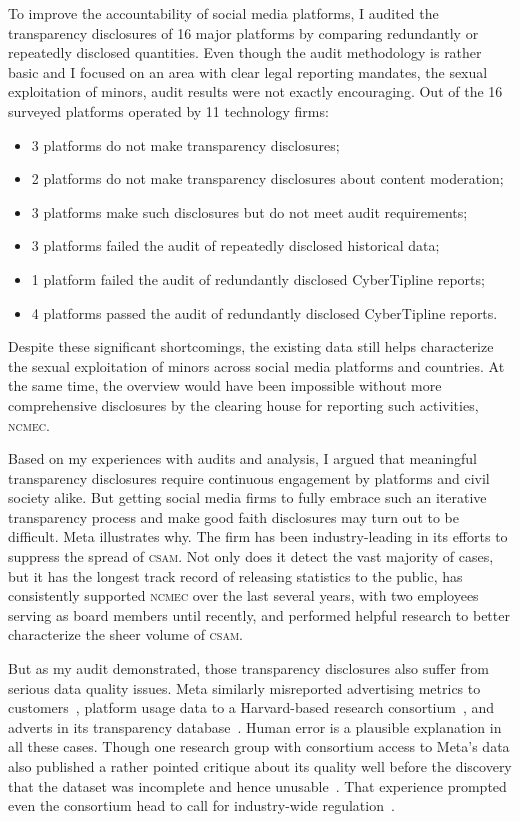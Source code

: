 \documentclass[nonacm,screen]{acmart}
\newcommand\V[1]{\textsc{\MakeLowercase{#1}}}
\begin{document}
To improve the accountability of social media platforms, I audited the
transparency disclosures of 16 major platforms by comparing redundantly or
repeatedly disclosed quantities. Even though the audit methodology is rather
basic and I focused on an area with clear legal reporting mandates, the sexual
exploitation of minors, audit results were not exactly encouraging. Out of the
16 surveyed platforms operated by 11 technology firms:
\begin{itemize}
\item[\ding{56}] 3 platforms do not make transparency disclosures;
\item[\ding{56}] 2 platforms do not make transparency disclosures about content moderation;
\item[\ding{56}] 3 platforms make such disclosures but do not meet audit requirements;
\item[\ding{56}] 3 platforms failed the audit of repeatedly disclosed historical data;
\item[\ding{56}] 1 platform failed the audit of redundantly disclosed CyberTipline reports;
\item[\ding{52}] 4 platforms passed the audit of redundantly disclosed CyberTipline reports.
\end{itemize}
Despite these significant shortcomings, the existing data still helps
characterize the sexual exploitation of minors across social media platforms and
countries. At the same time, the overview would have been impossible without
more comprehensive disclosures by the clearing house for reporting such
activities, \V{NCMEC}.

Based on my experiences with audits and analysis, I argued that meaningful
transparency disclosures require continuous engagement by platforms and civil
society alike. But getting social media firms to fully embrace such an iterative
transparency process and make good faith disclosures may turn out to be
difficult. Meta illustrates why. The firm has been industry-leading in its
efforts to suppress the spread of \V{CSAM}. Not only does it detect the vast
majority of cases, but it has the longest track record of releasing statistics
to the public, has consistently supported \V{NCMEC} over the last several years,
with two employees serving as board members until recently, and performed
helpful research to better characterize the sheer volume of \V{CSAM}.

But as my audit demonstrated, those transparency disclosures also suffer from
serious data quality issues. Meta similarly misreported advertising metrics to
customers~\cite{BruellPatel2020,Hutchinson2016,Hutchinson2016b,Hutchinson2017,
VranicaMarshall2016}, platform usage data to a Harvard-based research
consortium~\cite{Timberg2021}, and adverts in its transparency
database~\cite{Rosenberg2019,ScottMontellaro2021,SilvermanMac2020a}. Human error
is a plausible explanation in all these cases. Though one research group with
consortium access to Meta's data also published a rather pointed critique about
its quality well before the discovery that the dataset was incomplete and hence
unusable~\cite{Hegelich2020,HegelichMarcoea2020}. That experience prompted even
the consortium head to call for industry-wide
regulation~\cite{PersilyTucker2021}.
\end{document}
